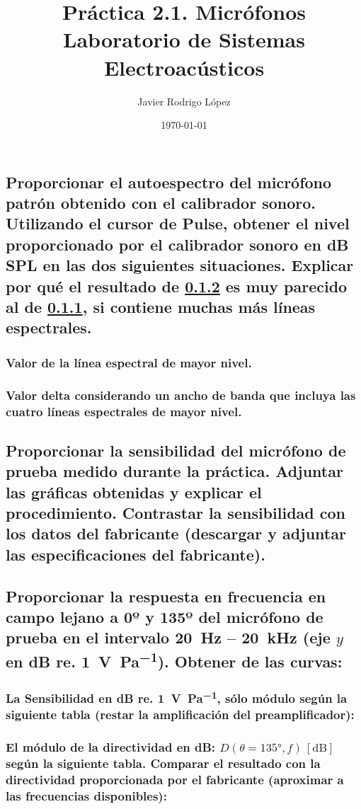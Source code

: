 \documentclass[10pt]{article}
\title{\Huge Práctica 2.1. Micrófonos \\\huge Laboratorio de Sistemas Electroacústicos}
\author{Javier Rodrigo López}
\date{\today}
\begin{document}
\maketitle

\subsection{Proporcionar el autoespectro del micrófono patrón obtenido con el calibrador sonoro. Utilizando el cursor de Pulse, obtener el nivel proporcionado por el calibrador sonoro en dB SPL en las dos siguientes situaciones. Explicar por qué el resultado de \ref{sec:segundo} es muy parecido al de \ref{sec:primero}, si contiene muchas más líneas espectrales.}
\subsubsection{Valor de la línea espectral de mayor nivel.} \label{sec:primero}
\subsubsection{Valor delta considerando un ancho de banda que incluya las cuatro líneas espectrales de mayor nivel.} \label{sec:segundo}

\subsection{Proporcionar la sensibilidad del micrófono de prueba medido durante la práctica. Adjuntar las gráficas obtenidas y explicar el procedimiento. Contrastar la sensibilidad con los datos del fabricante (descargar y adjuntar las especificaciones del fabricante).}

\subsection{Proporcionar la respuesta en frecuencia en campo lejano a 0º y 135º del micrófono de prueba en el intervalo \qty{20}{\hertz } – \qty{20}{\kilo\hertz } (eje $y$ en dB re. \qty{1}{\volt\per\pascal}). Obtener de las curvas:}
\subsubsection{La Sensibilidad en dB re. \qty{1}{\volt\per\pascal}, sólo módulo según la siguiente tabla (restar la amplificación del preamplificador):}
\subsubsection{El módulo de la directividad en dB: $D(\theta = \ang{135}, f) \, [\unit{\dB}]$  según la siguiente tabla. Comparar el resultado con la directividad proporcionada por el fabricante (aproximar a las frecuencias disponibles):}
\end{document}
